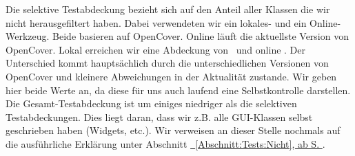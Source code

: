 Die selektive Testabdeckung bezieht sich auf den Anteil aller Klassen die wir nicht herausgefiltert haben. Dabei verwendeten wir ein lokales- und ein Online-Werkzeug. Beide basieren auf OpenCover. Online läuft die aktuellste Version von OpenCover. Lokal erreichen wir eine Abdeckung von \VSLocalCoverage~und online \OnlineLocalCoverage. Der Unterschied kommt hauptsächlich durch die unterschiedlichen Versionen von OpenCover und kleinere Abweichungen in der Aktualität zustande. Wir geben hier beide Werte an, da diese für uns auch laufend eine Selbstkontrolle darstellen. Die Gesamt-Testabdeckung ist um einiges niedriger als die selektiven Testabdeckungen. Dies liegt daran, dass wir z.B. alle GUI-Klassen selbst geschrieben haben (Widgets, etc.). Wir verweisen an dieser Stelle nochmals auf die ausführliche Erklärung unter Abschnitt \hyperref[Abschnitt:Tests:Nicht]{\mousecursor~\ref{Abschnitt:Tests:Nicht}, ab S. \pageref{Abschnitt:Tests:Nicht}}.



\thispagestyle{empty}
\pagestyle{empty}

\begin{figure}[h!]

   
\end{figure}


